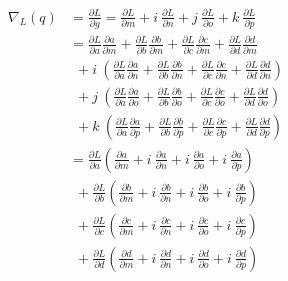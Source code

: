 \documentclass[14pt,a4paper]{article}
\begin{document}
\begin{align}
\nabla_L(q) &= \frac{\partial L}{\partial g} = \frac{\partial L}{\partial m} + \textit{i}~\frac{\partial L}{\partial n} + \textit{j}~\frac{\partial L}{\partial o} + \textit{k}~\frac{\partial L}{\partial p} \\ \nonumber
&= \frac{\partial L}{\partial a}\frac{\partial a}{\partial m} + \frac{\partial L}{\partial b}\frac{\partial b}{\partial m} + \frac{\partial L}{\partial c}\frac{\partial c}{\partial m} + \frac{\partial L}{\partial d}\frac{\partial d}{\partial m} \\ \nonumber
&~~+ \textit{i}~\left( \frac{\partial L}{\partial a}\frac{\partial a}{\partial n} + \frac{\partial L}{\partial b}\frac{\partial b}{\partial n} + \frac{\partial L}{\partial c}\frac{\partial c}{\partial n} + \frac{\partial L}{\partial d}\frac{\partial d}{\partial n} \right) \\ \nonumber
&~~+ \textit{j}~\left( \frac{\partial L}{\partial a}\frac{\partial a}{\partial o} + \frac{\partial L}{\partial b}\frac{\partial b}{\partial o} + \frac{\partial L}{\partial c}\frac{\partial c}{\partial o} + \frac{\partial L}{\partial d}\frac{\partial d}{\partial o} \right) \\ \nonumber
&~~+ \textit{k}~\left( \frac{\partial L}{\partial a}\frac{\partial a}{\partial p} + \frac{\partial L}{\partial b}\frac{\partial b}{\partial p} + \frac{\partial L}{\partial c}\frac{\partial c}{\partial p} + \frac{\partial L}{\partial d}\frac{\partial d}{\partial p} \right) \\ \nonumber
&= \frac{\partial L}{\partial a} \left( \frac{\partial a}{\partial m} + \textit{i}~\frac{\partial a}{\partial n} + \textit{i}~\frac{\partial a}{\partial o} + \textit{i}~\frac{\partial a}{\partial p} \right) \\ \nonumber
&~~+ \frac{\partial L}{\partial b} \left( \frac{\partial b}{\partial m} + \textit{i}~\frac{\partial b}{\partial n} + \textit{i}~\frac{\partial b}{\partial o} + \textit{i}~\frac{\partial b}{\partial p} \right) \\ \nonumber
&~~+ \frac{\partial L}{\partial c} \left( \frac{\partial c}{\partial m} + \textit{i}~\frac{\partial c}{\partial n} + \textit{i}~\frac{\partial c}{\partial o} + \textit{i}~\frac{\partial c}{\partial p} \right) \\ \nonumber
&~~+ \frac{\partial L}{\partial d} \left( \frac{\partial d}{\partial m} + \textit{i}~\frac{\partial d}{\partial n} + \textit{i}~\frac{\partial d}{\partial o} + \textit{i}~\frac{\partial d}{\partial p} \right) \\ \nonumber

\end{align}
\end{document}
